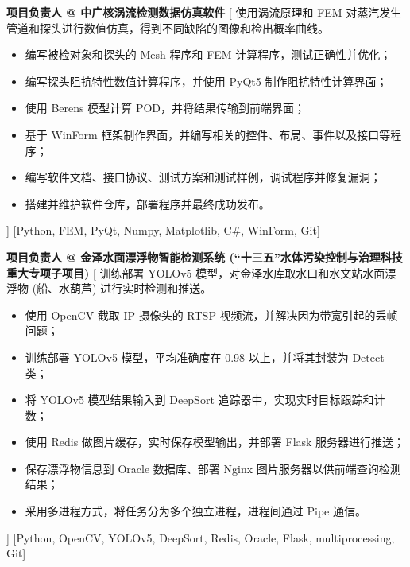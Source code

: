 \begin{experiences}
    {\textbf{项目负责人 @ 中广核涡流检测数据仿真软件}}%
    [
    使用涡流原理和 FEM 对蒸汽发生管道和探头进行数值仿真，得到不同缺陷的图像和检出概率曲线。
        \begin{itemize}
            \item {编写被检对象和探头的 Mesh 程序和 FEM 计算程序，测试正确性并优化；}
            \item {编写探头阻抗特性数值计算程序，并使用 PyQt5 制作阻抗特性计算界面；}
            \item {使用 Berens 模型计算 POD，并将结果传输到前端界面；}
            \item {基于 WinForm 框架制作界面，并编写相关的控件、布局、事件以及接口等程序；}
            \item {编写软件文档、接口协议、测试方案和测试样例，调试程序并修复漏洞；}
            \item {搭建并维护软件仓库，部署程序并最终成功发布。}
        \end{itemize}
    ]
    [Python, FEM, PyQt, Numpy, Matplotlib, C\#, WinForm, Git]
    \separator{0.5ex}

    {\textbf{项目负责人 @ 金泽水面漂浮物智能检测系统 (``十三五''水体污染控制与治理科技重大专项子项目)}}%
    [
    训练部署 YOLOv5 模型，对金泽水库取水口和水文站水面漂浮物 (船、水葫芦) 进行实时检测和推送。
        \begin{itemize}
            \item {使用 OpenCV 截取 IP 摄像头的 RTSP 视频流，并解决因为带宽引起的丢帧问题；}
            \item {训练部署 YOLOv5 模型，平均准确度在 0.98 以上，并将其封装为 Detect 类；}
            \item {将 YOLOv5 模型结果输入到 DeepSort 追踪器中，实现实时目标跟踪和计数；}
            \item {使用 Redis 做图片缓存，实时保存模型输出，并部署 Flask 服务器进行推送；}
            \item {保存漂浮物信息到 Oracle 数据库、部署 Nginx 图片服务器以供前端查询检测结果；}
            \item {采用多进程方式，将任务分为多个独立进程，进程间通过 Pipe 通信。}
        \end{itemize}]
    [Python, OpenCV, YOLOv5, DeepSort, Redis, Oracle, Flask, multiprocessing, Git]
\end{experiences}